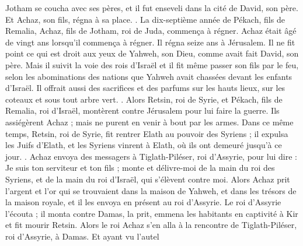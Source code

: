 \begin{multicols}{2}
Jotham se coucha avec ses pères, et il fut enseveli dans la cité de David, son père. Et Achaz, son fils, régna à sa place.
.
\VerseOne{}La dix-septième année de Pékach, fils de Remalia, Achaz, fils de Jotham, roi de Juda, commença à régner.
Achaz était âgé de vingt ans lorsqu'il commença à régner. Il régna seize ans à Jérusalem. Il ne fit point ce qui est droit aux yeux de Yahweh, son Dieu, comme avait fait David, son père.
Mais il suivit la voie des rois d'Israël et il fit même passer son fils par le feu, selon les abominations des nations que Yahweh avait chassées devant les enfants d'Israël.
Il offrait aussi des sacrifices et des parfums sur les hauts lieux, sur les coteaux et sous tout arbre vert.
.
Alors Retsin, roi de Syrie, et Pékach, fils de Remalia, roi d'Israël, montèrent contre Jérusalem pour lui faire la guerre. Ils assiégèrent Achaz ; mais ne purent en venir à bout par les armes.
Dans ce même temps, Retsin, roi de Syrie, fit rentrer Elath au pouvoir des Syriens ; il expulsa les Juifs d'Elath, et les Syriens vinrent à Elath, où ils ont demeuré jusqu'à ce jour.
.
Achaz envoya des messagers à Tiglath-Piléser, roi d'Assyrie, pour lui dire : Je suis ton serviteur et ton fils ; monte et délivre-moi de la main du roi des Syriens, et de la main du roi d'Israël, qui s'élèvent contre moi.
Alors Achaz prit l'argent et l'or qui se trouvaient dans la maison de Yahweh, et dans les trésors de la maison royale, et il les envoya en présent au roi d'Assyrie.
Le roi d'Assyrie l'écouta ; il monta contre Damas, la prit, emmena les habitants en captivité à Kir et fit mourir Retsin.
Alors le roi Achaz s'en alla à la rencontre de Tiglath-Piléser, roi d'Assyrie, à Damas. Et ayant vu l'autel
\end{multicols}
